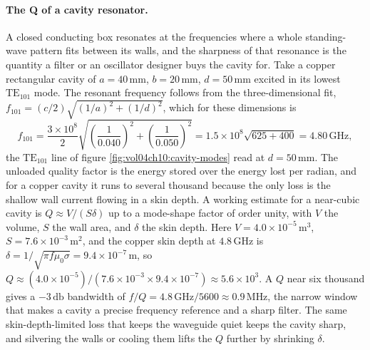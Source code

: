 \paragraph{The Q of a cavity resonator.}
A closed conducting box resonates at the frequencies where a whole
standing-wave pattern fits between its walls, and the sharpness of that
resonance is the quantity a filter or an oscillator designer buys the
cavity for. Take a copper rectangular cavity of $a = 40\,\si{\milli
\meter}$, $b = 20\,\si{\milli\meter}$, $d = 50\,\si{\milli\meter}$ excited
in its lowest $\text{TE}_{101}$ mode. The resonant frequency follows from
the three-dimensional fit, $f_{101} = (c/2)\sqrt{(1/a)^2 + (1/d)^2}$,
which for these dimensions is
\[
f_{101} = \frac{3\times 10^{8}}{2}\sqrt{\left(\frac{1}{0.040}\right)^{2} +
\left(\frac{1}{0.050}\right)^{2}} = 1.5\times 10^{8}\sqrt{625 + 400} =
4.80\,\si{\giga\hertz},
\]
the $\text{TE}_{101}$ line of figure \ref{fig:vol04ch10:cavity-modes} read
at $d = 50\,\si{\milli\meter}$. The unloaded quality factor is the energy
stored over the energy lost per radian, and for a copper cavity it runs to
several thousand because the only loss is the shallow wall current flowing
in a skin depth. A working estimate for a near-cubic cavity is $Q\approx
V/(S\delta)$ up to a mode-shape factor of order unity, with $V$ the volume,
$S$ the wall area, and $\delta$ the skin depth. Here $V = 4.0\times 10^{-5}
\,\si{\meter}^{3}$, $S = 7.6\times 10^{-3}\,\si{\meter}^{2}$, and the copper
skin depth at $4.8\,\si{\giga\hertz}$ is $\delta = 1/\sqrt{\pi f\mu_0\sigma}
= 9.4\times 10^{-7}\,\si{\meter}$, so $Q\approx (4.0\times 10^{-5})/
(7.6\times 10^{-3}\times 9.4\times 10^{-7}) \approx 5.6\times 10^{3}$. A
$Q$ near six thousand gives a $-3\,\si{\decibel}$ bandwidth of $f/Q =
4.8\,\si{\giga\hertz}/5600 \approx 0.9\,\si{\mega\hertz}$, the narrow window
that makes a cavity a precise frequency reference and a sharp filter. The
same skin-depth-limited loss that keeps the waveguide quiet keeps the
cavity sharp, and silvering the walls or cooling them lifts the $Q$ further
by shrinking $\delta$.



